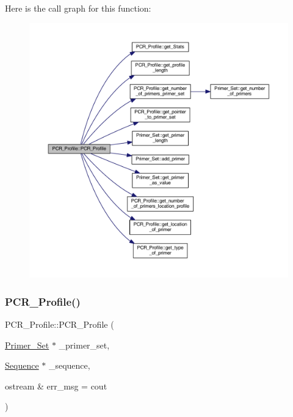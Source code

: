 Here is the call graph for this function\+:
\nopagebreak
\begin{figure}[H]
\begin{center}
\leavevmode
\includegraphics[width=350pt]{class_p_c_r___profile_a4b621dd306d51186d84ac65929f14e7b_cgraph}
\end{center}
\end{figure}
\mbox{\label{class_p_c_r___profile_a2772873e5a43e8b8c1dde4b6ca9d8a2f}} 
\subsubsection{\texorpdfstring{P\+C\+R\+\_\+\+Profile()}{PCR\_Profile()}\hspace{0.1cm}{\footnotesize\ttfamily [3/3]}}
{\footnotesize\ttfamily P\+C\+R\+\_\+\+Profile\+::\+P\+C\+R\+\_\+\+Profile (\begin{DoxyParamCaption}\item[{\mbox{\hyperlink{class_primer___set}{Primer\+\_\+\+Set}} $\ast$}]{\+\_\+primer\+\_\+set,  }\item[{\mbox{\hyperlink{class_sequence}{Sequence}} $\ast$}]{\+\_\+sequence,  }\item[{ostream \&}]{err\+\_\+msg = {\ttfamily cout} }\end{DoxyParamCaption})}



